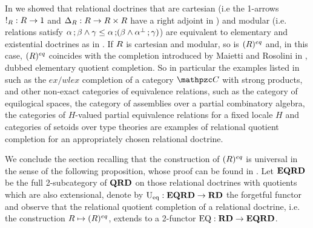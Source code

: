 

\begin{remark}\label{rem:MillyPino} 
In \cite{DagninoP25apal} we showed that relational doctrines that are cartesian (i.e the 1-arrows $\fun{!_\RDoc}{\RDoc}{1}$ and $\fun{\Delta_\RDoc}{\RDoc}{\RDoc\times \RDoc}$
have a right adjoint in \RDtn) and modular (i.e. relations satisfy $\alpha\mathop{\mathbf{;}}\beta \wedge \gamma \le \alpha\mathop{\mathbf{;}}(\beta\wedge \alpha^{\bot}\mathop{\mathbf{;}}\gamma)$) are equivalent to elementary and existential doctrines as in \cite{MaiettiME:quofcm}. 
% 
If $R$ is cartesian and modular, so is $(R)^{eq}$ and, in this case, $(R)^{eq}$ coincides with the completion introduced by Maietti and Rosolini in \cite{MaiettiME:eleqc,MaiettiME:quofcm}, dubbed elementary quotient completion. So in particular the examples listed in \cite{MaiettiME:eleqc,MaiettiME:quofcm} such as the $ex/wlex$ completion of a category $\CC$ with strong products, and other non-exact categories of equivalence relations, such as the category of equilogical spaces, the category of assemblies over a partial combinatory algebra, the categories of $H$-valued partial equivalence relations for a fixed locale $H$ and categories of setoids over type theories are examples of relational quotient completion for an appropriately chosen relational doctrine.
\end{remark}


We conclude the section recalling that the construction of $(R)^{eq}$ is universal in the sense of the following proposition, whose proof can be found in \cite{DagninoP25apal}. Let $\mathbf{EQRD}$ be the full 2-subcategory of $\mathbf{QRD}$ on those relational doctrines with quotients which are also extensional, denote by $\fun{\EQRFun}{\EQRDtn}{\RDtn}$ the forgetful functor and observe that the relational quotient completion of a relational doctrine, i.e. the construction $R\mapsto(R)^{eq}$, extends to a 2-functor $\fun{\REQFun}{\RDtn}{\EQRDtn}$.

